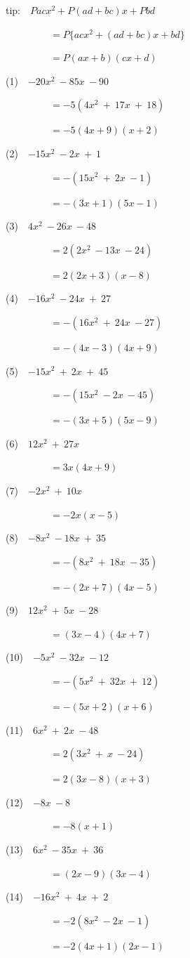 \documentclass[a4j,twocolumn,10pt,fleqn]{jarticle}
\begin{document}
tip:~~$Pacx^2 + P(ad + bc)x + Pbd$

~~~~~~~~~$= P\{acx^2 + (ad + bc)x +bd\}$

~~~~~~~~~$= P(ax + b)(cx + d)$

(1)~~$-20x^2~-85x~-90$

~~~~~~~~~$=-5(4x^2~+~17x~+~18)$

~~~~~~~~~$=-5(4x+9)(x+2)$

(2)~~$-15x^2~-2x~+~1$

~~~~~~~~~$=-(15x^2~+~2x~-1)$

~~~~~~~~~$=-(3x+1)(5x-1)$

(3)~~$4x^2~-26x~-48$

~~~~~~~~~$=2(2x^2~-13x~-24)$

~~~~~~~~~$=2(2x+3)(x-8)$

(4)~~$-16x^2~-24x~+~27$

~~~~~~~~~$=-(16x^2~+~24x~-27)$

~~~~~~~~~$=-(4x-3)(4x+9)$

(5)~~$-15x^2~+~2x~+~45$

~~~~~~~~~$=-(15x^2~-2x~-45)$

~~~~~~~~~$=-(3x+5)(5x-9)$

(6)~~$12x^2~+~27x$

~~~~~~~~~$=3x(4x+9)$

(7)~~$-2x^2~+~10x$

~~~~~~~~~$=-2x(x-5)$

(8)~~$-8x^2~-18x~+~35$

~~~~~~~~~$=-(8x^2~+~18x~-35)$

~~~~~~~~~$=-(2x+7)(4x-5)$

(9)~~$12x^2~+~5x~-28$

~~~~~~~~~$=(3x-4)(4x+7)$

(10)~~$-5x^2~-32x~-12$

~~~~~~~~~$=-(5x^2~+~32x~+~12)$

~~~~~~~~~$=-(5x+2)(x+6)$

(11)~~$6x^2~+~2x~-48$

~~~~~~~~~$=2(3x^2~+~x~-24)$

~~~~~~~~~$=2(3x-8)(x+3)$

(12)~~$-8x~-8$

~~~~~~~~~$=-8(x+1)$

(13)~~$6x^2~-35x~+~36$

~~~~~~~~~$=(2x-9)(3x-4)$

(14)~~$-16x^2~+~4x~+~2$

~~~~~~~~~$=-2(8x^2~-2x~-1)$

~~~~~~~~~$=-2(4x+1)(2x-1)$
\end{document}
